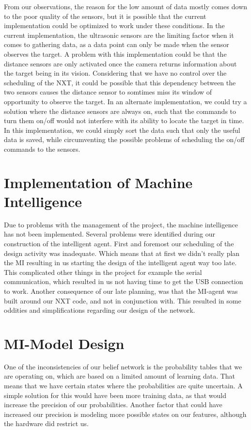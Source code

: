 From our observations, the reason for the low amount of data mostly comes down
to the poor quality of the sensors, but it is possible that the current
implementation could be optimized to work under these conditions. In the current
implementation, the ultrasonic sensors are the limiting factor when it comes to
gathering data, as a data point can only be made when the sensor observes the
target.
A problem with this implementation could be that the distance sensors are only
activated once the camera returns information about the target being in its
vision. Considering that we have no control over the scheduling of the NXT, it
could be possible that this dependency between the two sensors causes the
distance sensor to somtimes miss its window of opportunity to observe the
target.
In an alternate implementation, we could try a solution where the distance
sensors are always on, such that the commands to turn them on/off would not
interfere with its ability to locate the target in time. In this implementation,
we could simply sort the data such that only the useful data is saved, while
circumventing the possible problems of scheduling the on/off commands to the
sensors.

\section{Implementation of Machine Intelligence}
Due to problems with the management of the project, the machine intelligence has
not been implemented. Several problems were identified during our construction of the intelligent agent. First and foremost our scheduling of the design activity was inadequate. Which means that at first we didn't really plan the MI resulting in us starting the design of the intelligent agent way too late. This complicated other things in the project for example the serial communication, which resulted in us not having time to get the USB connection to work. Another consequence of our late planning, was that the MI-agent was built around our NXT code, and not in conjunction with. This resulted in some oddities and simplifications regarding our design of the network.


\section{MI-Model Design}
One of the inconsistencies of our belief network is the probability tables that we are operating on, which are based on a limited amount of learning data. That means that we have certain states where the probabilities are quite uncertain. A simple solution for this would have been more training data, as that would increase the precision of our probabilities. Another factor that could have increased our precision is modeling more possible states on our features, although the hardware did restrict us.

